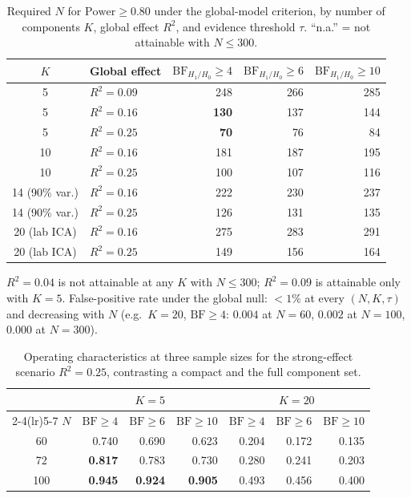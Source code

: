 \documentclass[11pt,a4paper]{article}
\newcommand{\BF}{\mathrm{BF}}
\begin{document}
\begin{table}[H]
\centering\small
\caption{Required $N$ for $\mathrm{Power}\ge0.80$ under the global-model criterion, by number of components $K$, global effect $R^{2}$, and evidence threshold $\tau$. ``n.a.'' = not attainable with $N\le300$.}
\label{tab:v4}
\begin{tabular}{clrrr}
\toprule
$K$ & Global effect & $\BF_{H_1/H_0}\ge4$ & $\BF_{H_1/H_0}\ge6$ & $\BF_{H_1/H_0}\ge10$\\
\midrule
\rowcolor{RowGrey}
5 & $R^2=0.09$ & 248 & 266 & 285\\
\rowcolor{RowGrey}
5 & $R^2=0.16$ & \textbf{130} & 137 & 144\\
\rowcolor{RowGrey}
5 & $R^2=0.25$ & \textbf{70} & 76 & 84\\
10 & $R^2=0.16$ & 181 & 187 & 195\\
10 & $R^2=0.25$ & 100 & 107 & 116\\
14 (90\% var.) & $R^2=0.16$ & 222 & 230 & 237\\
14 (90\% var.) & $R^2=0.25$ & 126 & 131 & 135\\
20 (lab ICA) & $R^2=0.16$ & 275 & 283 & 291\\
20 (lab ICA) & $R^2=0.25$ & 149 & 156 & 164\\
\bottomrule
\end{tabular}

\vspace{2pt}
{\footnotesize $R^{2}=0.04$ is not attainable at any $K$ with $N\le300$; $R^{2}=0.09$ is attainable only with $K=5$. False-positive rate under the global null: $<1\%$ at every $(N,K,\tau)$ and decreasing with $N$ (e.g.\ $K=20$, $\BF\ge4$: $0.004$ at $N=60$, $0.002$ at $N=100$, $0.000$ at $N=300$).}
\end{table}

\begin{table}[H]
\centering\small
\caption{Operating characteristics at three sample sizes for the strong-effect scenario $R^{2}=0.25$, contrasting a compact and the full component set.}
\label{tab:v4op}
\begin{tabular}{crrrrrr}
\toprule
 & \multicolumn{3}{c}{$K=5$} & \multicolumn{3}{c}{$K=20$}\\
\cmidrule(lr){2-4}\cmidrule(lr){5-7}
$N$ & $\BF\ge4$ & $\BF\ge6$ & $\BF\ge10$ & $\BF\ge4$ & $\BF\ge6$ & $\BF\ge10$\\
\midrule
60 & 0.740 & 0.690 & 0.623 & 0.204 & 0.172 & 0.135\\
72 & \textbf{0.817} & 0.783 & 0.730 & 0.280 & 0.241 & 0.203\\
100 & \textbf{0.945} & \textbf{0.924} & \textbf{0.905} & 0.493 & 0.456 & 0.400\\
\bottomrule
\end{tabular}
\end{table}
\end{document}
